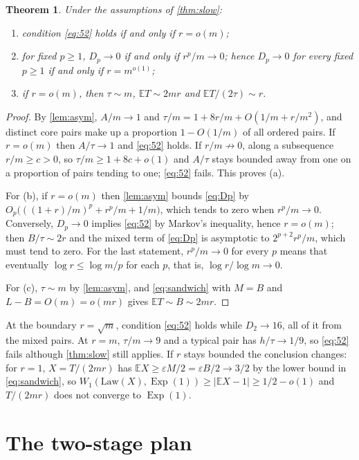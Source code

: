 \documentclass[11pt,a4paper]{article}
\numberwithin{equation}{section}
\newtheorem{theorem}{Theorem}[section]
\theoremstyle{remark}
\newcommand{\E}{\mathbb E}
\newcommand{\eps}{\varepsilon}
\newcommand{\Exp}{\operatorname{Exp}}
\newcommand{\abs}[1]{\lvert#1\rvert}
\begin{document}
\begin{theorem}\label{thm:conc}
Under the assumptions of \cref{thm:slow}:
\begin{enumerate}[label=\textup{(\alph*)}]
\item condition \eqref{eq:52} holds if and only if $r=o(m)$;
\item for fixed $p\ge1$, $D_p\to0$ if and only if $r^p/m\to0$; hence $D_p\to0$ for every fixed $p\ge1$ if and only if $r=m^{o(1)}$;
\item if $r=o(m)$, then $\tau\sim m$, $\E T\sim2mr$ and $\E T/(2\tau)\sim r$.
\end{enumerate}
\end{theorem}

\begin{proof}
By \cref{lem:asym}, $A/m\to1$ and $\tau/m=1+8r/m+O(1/m+r/m^2)$, and distinct core pairs make up a proportion $1-O(1/m)$ of all ordered pairs. If $r=o(m)$ then $A/\tau\to1$ and \eqref{eq:52} holds. If $r/m\not\to0$, along a subsequence $r/m\ge c>0$, so $\tau/m\ge1+8c+o(1)$ and $A/\tau$ stays bounded away from one on a proportion of pairs tending to one; \eqref{eq:52} fails. This proves (a).

For (b), if $r=o(m)$ then \cref{lem:asym} bounds \eqref{eq:Dp} by $O_p\bigl(((1+r)/m)^p+r^p/m+1/m\bigr)$, which tends to zero when $r^p/m\to0$. Conversely, $D_p\to0$ implies \eqref{eq:52} by Markov's inequality, hence $r=o(m)$; then $B/\tau\sim2r$ and the mixed term of \eqref{eq:Dp} is asymptotic to $2^{p+2}r^p/m$, which must tend to zero. For the last statement, $r^p/m\to0$ for every $p$ means that eventually $\log r\le\log m/p$ for each $p$, that is, $\log r/\log m\to0$.

For (c), $\tau\sim m$ by \cref{lem:asym}, and \eqref{eq:sandwich} with $M=B$ and $L-B=O(m)=o(mr)$ gives $\E T\sim B\sim2mr$.
\end{proof}

At the boundary $r=\sqrt m$, condition \eqref{eq:52} holds while $D_2\to16$, all of it from the mixed pairs. At $r=m$, $\tau/m\to9$ and a typical pair has $h/\tau\to1/9$, so \eqref{eq:52} fails although \cref{thm:slow} still applies. If $r$ stays bounded the conclusion changes: for $r=1$, $X=T/(2mr)$ has $\E X\ge\eps M/2=\eps B/2\to3/2$ by the lower bound in \eqref{eq:sandwich}, so $W_1(\mathrm{Law}(X),\Exp(1))\ge\abs{\E X-1}\ge1/2-o(1)$ and $T/(2mr)$ does not converge to $\Exp(1)$.

\section{The two-stage plan}\label{sec:stages}
\end{document}
